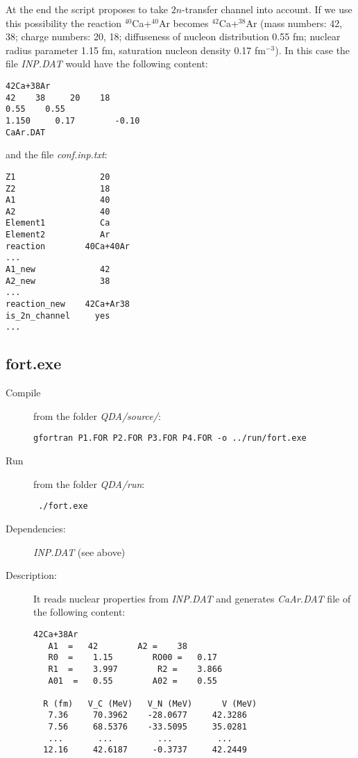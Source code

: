 \documentclass[preprint,review,12pt]{elsarticle}
\begin{document}
\begin{description}
At the end the script proposes to take $2n$-transfer channel into account.
If we use this possibility the reaction $^{40}$Ca+$^{40}$Ar becomes $^{42}$Ca+$^{38}$Ar
(mass numbers: 42, 38; charge numbers: 20, 18; diffuseness of nucleon distribution 0.55 fm;
nuclear radius parameter 1.15 fm, saturation nucleon density 0.17 fm$^{-3}$). In this case the file \textit{INP.DAT} would have the following content:
\begin{verbatim}
42Ca+38Ar
42    38     20    18
0.55    0.55
1.150     0.17        -0.10
CaAr.DAT
\end{verbatim}
and the file \textit{conf.inp.txt}:
\begin{verbatim}
Z1                 20
Z2                 18
A1                 40
A2                 40
Element1           Ca
Element2           Ar
reaction        40Ca+40Ar
...
A1_new             42
A2_new             38
...
reaction_new    42Ca+Ar38
is_2n_channel     yes
...
\end{verbatim}


    \end{description}



  \subsection{fort.exe}
  \label{sec:fort}
    \begin{description}
       \item[Compile]  from the folder \textit{QDA/source/}:
        \begin{verbatim}
gfortran P1.FOR P2.FOR P3.FOR P4.FOR -o ../run/fort.exe
        \end{verbatim}
\item[Run] from the folder \textit{QDA/run}:
        \begin{verbatim}
 ./fort.exe
        \end{verbatim}

       \item[Dependencies:]
           \subitem   \textit{INP.DAT} (see above)

       \item[Description:] It reads nuclear properties from \textit{INP.DAT} and generates \textit{CaAr.DAT} file of
    the following content:
    \begin{verbatim}
42Ca+38Ar
   A1  =   42        A2 =    38
   R0  =    1.15        RO00 =   0.17
   R1  =    3.997        R2 =    3.866
   A01  =   0.55        A02 =    0.55

  R (fm)   V_C (MeV)   V_N (MeV)      V (MeV)
   7.36     70.3962    -28.0677     42.3286
   7.56     68.5376    -33.5095     35.0281
   ...       ...         ...         ...
  12.16     42.6187     -0.3737     42.2449
    \end{verbatim}

    \end{description}
\end{document}

